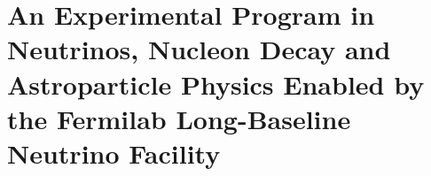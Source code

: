 

\chapter{An Experimental Program in Neutrinos, Nucleon Decay and Astroparticle Physics Enabled by the Fermilab Long-Baseline Neutrino Facility}
\label{ch:project-overview}

%
%
%
%
%
%
%
%
%

